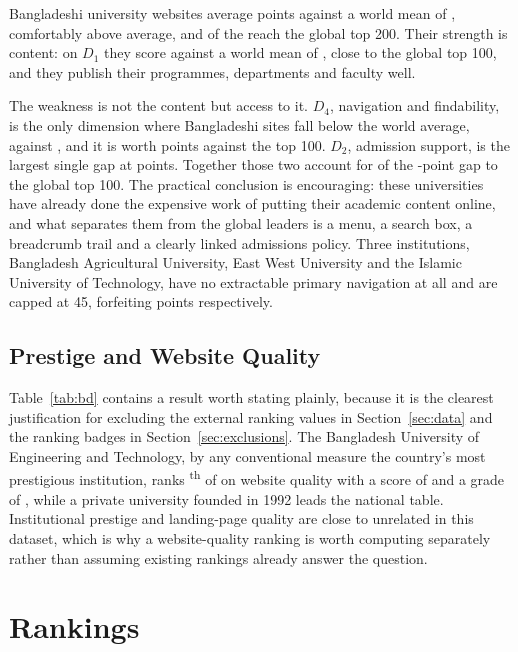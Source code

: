 \documentclass[11pt,a4paper]{article}
\begin{document}
\noindent Bangladeshi university websites average \bdMean{} points against a world mean of
\worldMean{}, comfortably above average, and \nTopTwoHundred{} of the \nBD{} reach the global top 200.
Their strength is content: on $D_1$ they score \bdDone{} against a world mean of \worldDone{}, close
to the global top 100, and they publish their programmes, departments and faculty well.

The weakness is not the content but access to it. $D_4$, navigation and findability, is the only
dimension where Bangladeshi sites fall below the world average, \bdDfour{} against \worldDfour{}, and
it is worth \bdGapDfour{} points against the top 100. $D_2$, admission support, is the largest single
gap at \bdGapDtwo{} points. Together those two account for \bdGapNavAdm{} of the \bdGapTop{}-point gap
to the global top 100. The practical conclusion is encouraging: these universities have already done
the expensive work of putting their academic content online, and what separates them from the global
leaders is a menu, a search box, a breadcrumb trail and a clearly linked admissions policy. Three
institutions, Bangladesh Agricultural University, East West University and the Islamic University of
Technology, have no extractable primary navigation at all and are capped at 45, forfeiting
\bdGateLoss{} points respectively.

\subsection{Prestige and Website Quality}
\label{sec:prestige}

Table~\ref{tab:bd} contains a result worth stating plainly, because it is the clearest justification
for excluding the external ranking values in Section~\ref{sec:data} and the ranking badges in
Section~\ref{sec:exclusions}. The Bangladesh University of Engineering and Technology, by any
conventional measure the country's most prestigious institution, ranks
\buetRank{}\textsuperscript{th} of \nBD{} on website quality with a score of \buetScore{} and a grade
of \buetGrade{}, while a private university founded in 1992 leads the national table. Institutional
prestige and landing-page quality are close to unrelated in this dataset, which is why a
website-quality ranking is worth computing separately rather than assuming existing rankings already
answer the question.

\section{Rankings}
\label{sec:rankings}
\end{document}
